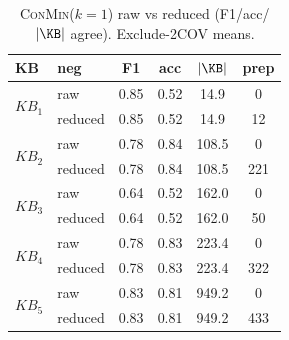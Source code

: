 \begin{table}[t]
\centering
\small
\begin{tabular}{llcccc}
\toprule
KB & neg & F1 & acc & $|\KB|$ & prep \tabularnewline
\midrule
\multirow{2}{*}{$KB_{1}$} & raw & 0.85 & 0.52 & 14.9 & 0 \tabularnewline
 & reduced & 0.85 & 0.52 & 14.9 & 12 \tabularnewline
\midrule
\multirow{2}{*}{$KB_{2}$} & raw & 0.78 & 0.84 & 108.5 & 0 \tabularnewline
 & reduced & 0.78 & 0.84 & 108.5 & 221 \tabularnewline
\midrule
\multirow{2}{*}{$KB_{3}$} & raw & 0.64 & 0.52 & 162.0 & 0 \tabularnewline
 & reduced & 0.64 & 0.52 & 162.0 & 50 \tabularnewline
\midrule
\multirow{2}{*}{$KB_{4}$} & raw & 0.78 & 0.83 & 223.4 & 0 \tabularnewline
 & reduced & 0.78 & 0.83 & 223.4 & 322 \tabularnewline
\midrule
\multirow{2}{*}{$KB_{5}$} & raw & 0.83 & 0.81 & 949.2 & 0 \tabularnewline
 & reduced & 0.83 & 0.81 & 949.2 & 433 \tabularnewline
\bottomrule
\end{tabular}
\caption{\textsc{ConMin}($k{=}1$) raw vs reduced (F1/acc/$|\KB|$ agree). Exclude-2COV means.}
\label{tab:app-rawred}
\end{table}

